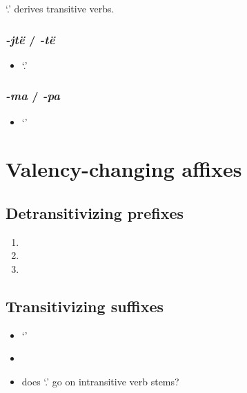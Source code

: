 \documentclass{memoir}
\begin{document}
 `.' derives transitive verbs.

\subsubsection{\texorpdfstring{\emph{-jtë} / \emph{-të}
\label{sec:jtevbz}}{-jtë / -të }}

\begin{itemize}
\tightlist
\item
   `.'
\end{itemize}

\subsubsection{\texorpdfstring{\emph{-ma} / \emph{-pa}
\label{sec:macaus}}{-ma / -pa }}

\begin{itemize}
\tightlist
\item
   `'
\end{itemize}

\section{Valency-changing affixes}

\subsection{\texorpdfstring{Detransitivizing prefixes
\label{sec:detrz}}{Detransitivizing prefixes }}

\begin{enumerate}
\def\labelenumi{\arabic{enumi}.}
\item
\item
\item
\end{enumerate}

\subsection{Transitivizing suffixes}

\begin{itemize}
\tightlist
\item
   `'
\item
\item
  does  `.' go on intransitive verb stems?
\end{itemize}
\end{document}
